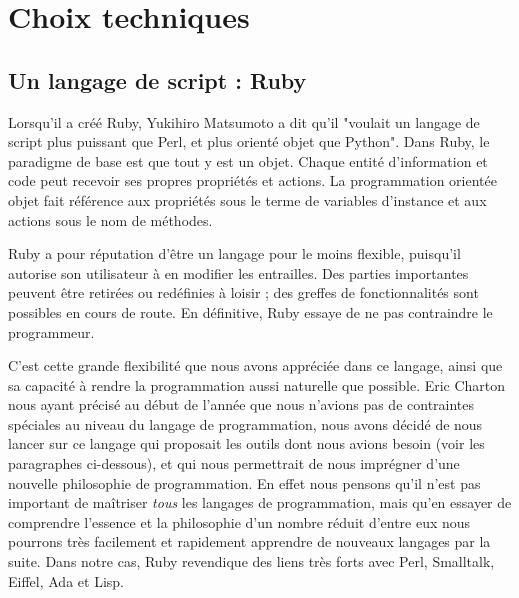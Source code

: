 \documentclass[10pt,a4paper]{article}
\begin{document}
\section{Choix techniques}
\subsection{Un langage de script : Ruby}
\par Lorsqu'il a créé Ruby, Yukihiro Matsumoto a dit qu'il "voulait un langage de script plus puissant que Perl, et plus orienté objet que Python". Dans Ruby, le paradigme de base est que tout y est un objet. Chaque entité d’information et code peut recevoir ses propres propriétés et actions. La programmation orientée objet fait référence aux propriétés sous le terme de variables d’instance et aux actions sous le nom de méthodes.
\par Ruby a pour réputation d’être un langage pour le moins flexible, puisqu’il autorise son utilisateur à en modifier les entrailles. Des parties importantes peuvent être retirées ou redéfinies à loisir ; des greffes de fonctionnalités sont possibles en cours de route. En définitive, Ruby essaye de ne pas contraindre le programmeur.
\par C'est cette grande flexibilité que nous avons appréciée dans ce langage, ainsi que sa capacité à rendre la programmation aussi naturelle que possible. Eric Charton nous ayant précisé au début de l'année que nous n'avions pas de contraintes spéciales au niveau du langage de programmation, nous avons décidé de nous lancer sur ce langage qui proposait les outils dont nous avions besoin (voir les paragraphes ci-dessous), et qui nous permettrait de nous imprégner d'une nouvelle philosophie de programmation. En effet nous pensons qu'il n'est pas important de maîtriser \textit{tous} les langages de programmation, mais qu'en essayer de comprendre l'essence et la philosophie d'un nombre réduit d'entre eux nous pourrons très facilement et rapidement apprendre de nouveaux langages par la suite. Dans notre cas, Ruby revendique des liens très forts avec Perl, Smalltalk, Eiffel, Ada et Lisp.
\end{document}
